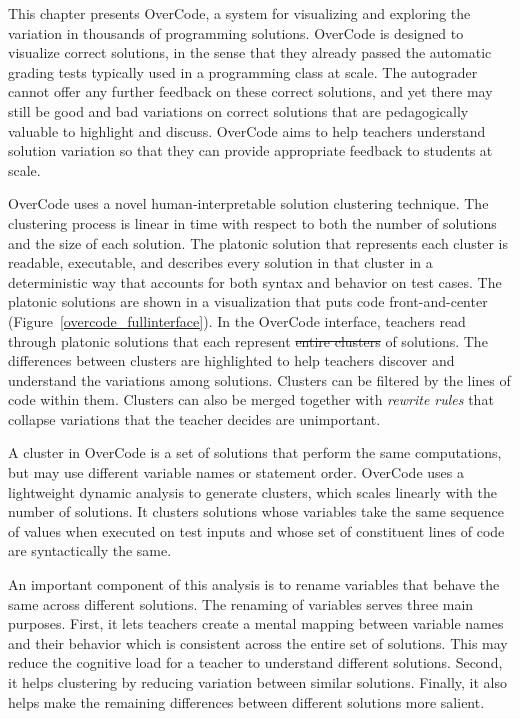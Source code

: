 \documentclass[12pt,twoside]{mitthesis}
\providecommand{\DIFaddtex}[1]{{\protect\color{blue}\uwave{#1}}} %
\providecommand{\DIFdeltex}[1]{{\protect\color{red}\sout{#1}}}                      %
\providecommand{\DIFaddbegin}{} %
\providecommand{\DIFaddend}{} %
\providecommand{\DIFdelbegin}{} %
\providecommand{\DIFdelend}{} %
\providecommand{\DIFadd}[1]{\texorpdfstring{\DIFaddtex{#1}}{#1}} %
\providecommand{\DIFdel}[1]{\texorpdfstring{\DIFdeltex{#1}}{}} %
\begin{document}
This chapter presents OverCode, a system for visualizing and exploring the variation in thousands of programming solutions. OverCode is designed to visualize correct solutions, in the sense that they already passed the automatic grading tests typically used in a programming class at scale. The autograder cannot offer any further feedback on these correct solutions, and yet there may still be good and bad variations on correct solutions that are pedagogically valuable to highlight and discuss. OverCode aims to help teachers understand solution variation so that they can provide appropriate feedback to students at scale.

OverCode uses a novel human-interpretable solution clustering technique. The clustering process is linear in time with respect to both the number of solutions and the size of each solution. The platonic solution that represents each cluster is readable, executable, and describes every solution in that cluster in a deterministic way that accounts for both syntax and behavior on test cases. The platonic solutions are shown in a visualization that puts code front-and-center (Figure~\ref{overcode_fullinterface}). In the OverCode interface, teachers read through platonic solutions that each represent \DIFdelbegin \DIFdel{entire clusters }\DIFdelend \DIFaddbegin \DIFadd{an entire cluster }\DIFaddend of solutions. The differences between clusters are highlighted to help teachers discover and understand the variations among solutions. Clusters can be filtered by the lines of code within them.  Clusters can also be merged together with {\em rewrite rules} that collapse variations that the teacher decides are unimportant. 

A cluster in OverCode is a set of solutions that perform the same computations, but may use different variable names or statement order.  OverCode uses a lightweight dynamic analysis to generate clusters, which scales linearly with the number of solutions. It clusters solutions whose variables take the same sequence of values when executed on test inputs and whose set of constituent lines of code are syntactically the same. 

An important component of this analysis is to rename variables that behave the same across different solutions. The renaming of variables serves three main purposes. First, it lets teachers create a mental mapping between variable names and their behavior which is consistent across the entire set of solutions. This may reduce the cognitive load for a teacher to understand different solutions. Second, it helps clustering by reducing variation between similar solutions. Finally, it also helps make the remaining differences between different solutions more salient. 
\end{document}
